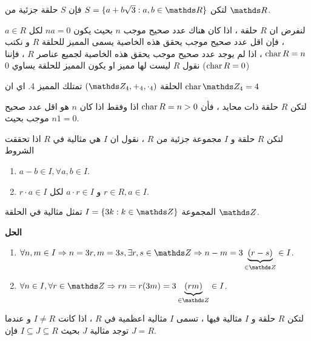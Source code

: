  \begin{example}
 	لتكن $S = \{a+b\sqrt{3} : a, b\in \R \}$ فإن $S$ حلقة جزئية من $\R$.
 \end{example}
 
 \begin{definition}
 	لنفرض ان $R$ حلقة ، اذا كان هناك عدد صحيح موجب $n$ بحيث يكون $na=0$ لكل $a\in R$ ، فإن اقل عدد صحيح موجب يحقق هذه الخاصية يسمى المميز للحلقة $R$ و نكتب $\operatorname{char} R = n$ ، اذا لم يوجد عدد صحيح موجب يحقق هذه الخاصية لجميع عناصر $R$ ، فإننا نقول $R$ ليست لها مميز او يكون المميز للحلقة يساوي 0 ($\operatorname{char} R=0$)
 \end{definition}
 
 \begin{example}
 	الحلقة 
 	$(\Z_4, +_4, \cdot_4) $ تمتلك المميز 4. اي ان $\Char \Z_4=4$
 \end{example}
 
 \begin{theorem}
 	لتكن $R$ حلقة ذات محايد ، فأن $\operatorname{char} R=n >0$ اذا وفقط اذا كان $n$ هو اقل عدد صحيح موجب بحيث $n1=0$.
 \end{theorem}
 
 
 \begin{definition}
 	لتكن $R$ حلقة و $I$ مجموعة جزئية من $R$ ، نقول ان $I$ هي مثالية في $R$ اذا تحققت الشروط
 	\begin{enumerate}[label=$\boxed{\arabic*}$]
 		\item $a-b\in I, \forall a, b\in I$.
 		\item $r\cdot a \in I$ و $a\cdot r\in I$ لكل $r\in R, a\in I$.
 	\end{enumerate}
 \end{definition}
 
 \begin{example}
 	المجموعة 
 	$I = \{3k : k\in \Z\}$ تمثل مثالية في الحلقة $\Z$.
 \end{example}
 \noindent
 \textbf{الحل}
 
 \setLR
 \begin{enumerate}[leftmargin=*, label=$\boxed{\arabic*}$]
 	\item $\forall n,m\in I \Rightarrow n=3r, m=3s, \exists r,s\in \Z \Rightarrow n-m =3\underbrace{(r-s)}_{\in \Z} \in I$.
 	\item $\forall n\in I, \forall r\in \Z \Rightarrow rn = r(3m) = 3\underbrace{(rm)}_{\in \Z} \in I$. 
 \end{enumerate}
 
 \setRL
 
 \begin{definition}[]
 	لتكن $R$ حلقة و $I$ مثالية فيها ، تسمى $I$ مثالية اعظمية في $R$ ، اذا كانت $I\neq R$ و عندما توجد مثالية $J$ بحيث 
 	$I \subseteq J \subseteq R$ فإن $J=R$.
 \end{definition}
 
